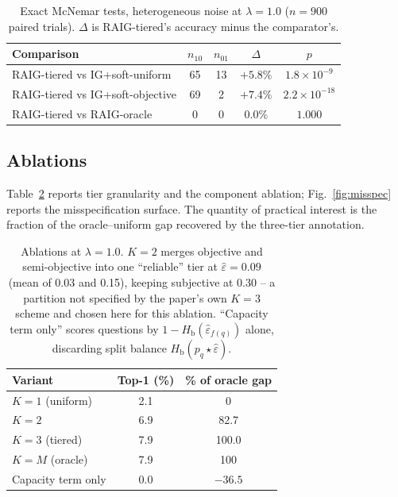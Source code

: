 \documentclass[conference]{IEEEtran}
\newcommand{\Hb}{H_{\mathrm{b}}}
\begin{document}
\begin{table}[t]
\caption{Exact McNemar tests, heterogeneous noise at $\lambda=1.0$ ($n=900$
paired trials). $\Delta$ is RAIG-tiered's accuracy minus the comparator's.}
\label{tab:mcnemar}
\centering
\footnotesize
\begin{tabular}{@{}lcccc@{}}
\toprule
\textbf{Comparison} & \textbf{$n_{10}$} & \textbf{$n_{01}$} & \textbf{$\Delta$} & \textbf{$p$} \\
\midrule
RAIG-tiered vs IG+soft-uniform & 65 & 13 & $+5.8\%$ & $1.8\times10^{-9}$ \\
RAIG-tiered vs IG+soft-objective & 69 & 2 & $+7.4\%$ & $2.2\times10^{-18}$ \\
RAIG-tiered vs RAIG-oracle & 0 & 0 & $0.0\%$ & $1.000$ \\
\bottomrule
\end{tabular}
\end{table}

\subsection{Ablations}

Table~\ref{tab:ablation} reports tier granularity and the component ablation;
Fig.~\ref{fig:misspec} reports the misspecification surface. The quantity of
practical interest is the fraction of the oracle--uniform gap recovered by the
three-tier annotation.

\begin{table}[t]
\caption{Ablations at $\lambda=1.0$. $K=2$ merges objective and
semi-objective into one ``reliable'' tier at $\hat\varepsilon=0.09$ (mean of
0.03 and 0.15), keeping subjective at 0.30 -- a partition not specified by the
paper's own $K=3$ scheme and chosen here for this ablation. ``Capacity term
only'' scores questions by $1-\Hb(\hat\varepsilon_{f(q)})$ alone, discarding
split balance $\Hb(p_q\star\hat\varepsilon)$.}
\label{tab:ablation}
\centering
\footnotesize
\begin{tabular}{@{}lcc@{}}
\toprule
\textbf{Variant} & \textbf{Top-1 (\%)} & \textbf{\% of oracle gap} \\
\midrule
$K=1$ (uniform) & 2.1 & 0 \\
$K=2$ & 6.9 & 82.7 \\
$K=3$ (tiered) & 7.9 & 100.0 \\
$K=M$ (oracle) & 7.9 & 100 \\
Capacity term only & 0.0 & $-36.5$ \\
\bottomrule
\end{tabular}
\end{table}
\end{document}
